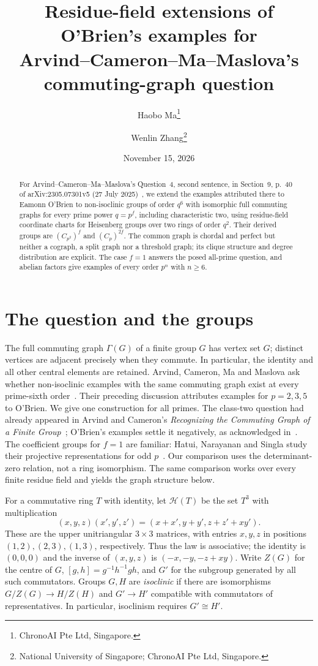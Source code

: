 \documentclass[11pt]{article}
\title{Residue-field extensions of O'Brien's examples for\protect\\
Arvind--Cameron--Ma--Maslova's commuting-graph question}
\author{Haobo Ma\thanks{ChronoAI Pte Ltd, Singapore.}\and
Wenlin Zhang\thanks{National University of Singapore; ChronoAI Pte Ltd, Singapore.}}
\date{November 15, 2026}
\newcommand{\HH}{\mathcal H}
\begin{document}
\maketitle
\begin{abstract}
For Arvind--Cameron--Ma--Maslova's Question~4, second sentence, in
Section~9, p.~40 of arXiv:2305.07301v5 (27 July 2025)~\cite{ACMM},
we extend the examples attributed there to Eamonn O'Brien to non-isoclinic
groups of order $q^6$ with isomorphic full commuting graphs for every
prime power $q=p^f$, including characteristic two, using residue-field
coordinate charts for Heisenberg groups over two rings of order $q^2$.
Their derived groups are $(C_{p^2})^f$ and $(C_p)^{2f}$.
The common graph is chordal and perfect but neither a cograph, a split
graph nor a threshold graph; its clique
structure and degree distribution are explicit.
The case $f=1$ answers the posed all-prime question, and abelian factors
give examples of every order $p^n$ with $n\geq6$.
\end{abstract}

\section{The question and the groups}
The full commuting graph $\Gamma(G)$ of a finite group $G$ has vertex set
$G$; distinct vertices are adjacent precisely when they commute. In
particular, the identity and all other central elements are retained.
Arvind, Cameron, Ma and Maslova ask whether non-isoclinic examples with
the same commuting graph exist at every prime-sixth order~\cite[Section 9,
Question 4]{ACMM}. Their preceding discussion attributes examples for
$p=2,3,5$ to O'Brien. We give one construction for all primes.
The class-two question had already appeared in Arvind and Cameron's
\emph{Recognizing the Commuting Graph of a Finite Group}~\cite[Section~8,
p.~21]{AC}; O'Brien's examples settle it negatively, as acknowledged
in~\cite[Section~9 and p.~55]{ACMM}.
The coefficient groups for $f=1$ are familiar: Hatui, Narayanan and
Singla study their projective representations for odd $p$~\cite[Sections 1--2]{HNS}.
Our comparison uses the determinant-zero relation, not a ring isomorphism.
The same comparison works over every finite residue field and yields
the graph structure below.

For a commutative ring $T$ with identity, let $\HH(T)$ be the set $T^3$
with multiplication
\begin{equation}\label{eq:law}
 (x,y,z)(x',y',z')=(x+x',y+y',z+z'+xy').
\end{equation}
These are the upper unitriangular $3\times3$ matrices, with entries $x,y,z$
in positions $(1,2),(2,3),(1,3)$, respectively. Thus the law is associative;
the identity is $(0,0,0)$ and the inverse of $(x,y,z)$ is
$(-x,-y,-z+xy)$. Write $Z(G)$ for the centre of $G$,
$[g,h]=g^{-1}h^{-1}gh$, and $G'$ for the
subgroup generated by all such commutators. Groups $G,H$ are
\emph{isoclinic} if there are isomorphisms $G/Z(G)\to H/Z(H)$ and
$G'\to H'$ compatible with commutators of representatives. In particular,
isoclinism requires $G'\cong H'$.
\end{document}
